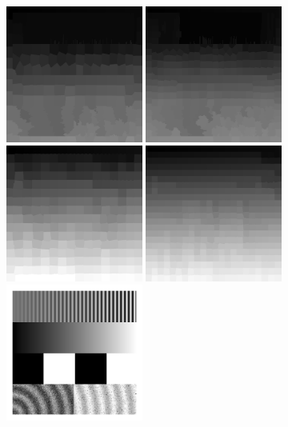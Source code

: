 \documentclass[
  12pt,
  openany]{book}
\begin{document}
\begin{figure}

{\centering \includegraphics[width=0.4\textwidth]{../imgs/slic_5_250} \includegraphics[width=0.4\textwidth]{../imgs/slic_5_500} \includegraphics[width=0.4\textwidth]{../imgs/slic_200_250} \includegraphics[width=0.4\textwidth]{../imgs/slic_200_500} \includegraphics[width=0.4\textwidth]{../imgs/geometric} 

}
\end{figure}
\end{document}
